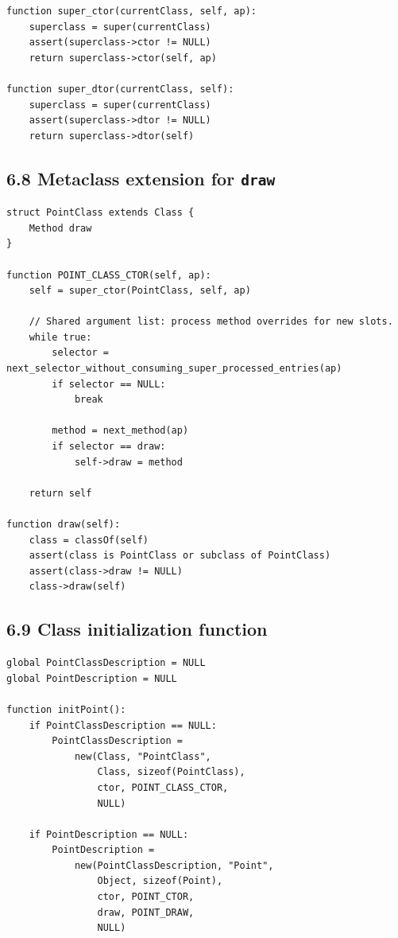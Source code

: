 \documentclass[11pt]{article}
\begin{document}
\begin{verbatim}
function super_ctor(currentClass, self, ap):
    superclass = super(currentClass)
    assert(superclass->ctor != NULL)
    return superclass->ctor(self, ap)

function super_dtor(currentClass, self):
    superclass = super(currentClass)
    assert(superclass->dtor != NULL)
    return superclass->dtor(self)
\end{verbatim}

\subsection{\texorpdfstring{6.8 Metaclass extension for
\texttt{draw}}{6.8 Metaclass extension for draw}}\label{metaclass-extension-for-draw}

\begin{verbatim}
struct PointClass extends Class {
    Method draw
}

function POINT_CLASS_CTOR(self, ap):
    self = super_ctor(PointClass, self, ap)

    // Shared argument list: process method overrides for new slots.
    while true:
        selector = next_selector_without_consuming_super_processed_entries(ap)
        if selector == NULL:
            break

        method = next_method(ap)
        if selector == draw:
            self->draw = method

    return self

function draw(self):
    class = classOf(self)
    assert(class is PointClass or subclass of PointClass)
    assert(class->draw != NULL)
    class->draw(self)
\end{verbatim}

\subsection{6.9 Class initialization
function}\label{class-initialization-function}

\begin{verbatim}
global PointClassDescription = NULL
global PointDescription = NULL

function initPoint():
    if PointClassDescription == NULL:
        PointClassDescription =
            new(Class, "PointClass",
                Class, sizeof(PointClass),
                ctor, POINT_CLASS_CTOR,
                NULL)

    if PointDescription == NULL:
        PointDescription =
            new(PointClassDescription, "Point",
                Object, sizeof(Point),
                ctor, POINT_CTOR,
                draw, POINT_DRAW,
                NULL)
\end{verbatim}
\end{document}
